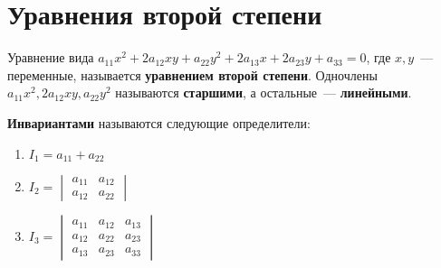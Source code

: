 \section{Уравнения второй степени}
\label{sect:second_degree_equations_on_plane}
Уравнение вида $a_{11} x^2 + 2 a_{12} xy + a_{22} y^2 + 2 a_{13} x + 2 a_{23} y + a_{33} = 0$, где $x, y$~--- переменные, называется \textbf{уравнением второй степени}.
Одночлены $a_{11} x^2, 2 a_{12} xy, a_{22} y^2$ называются \textbf{старшими}, а остальные~--- \textbf{линейными}.

\textbf{Инвариантами} называются следующие определители:
\begin{enumerate}
	\item $I_1 = a_{11} + a_{22}$
	
	\item $I_2 =
	\begin{vmatrix}
	a_{11} & a_{12} \\
	a_{12} & a_{22}
	\end{vmatrix}$
	
	\item $I_3 =
	\begin{vmatrix}
	a_{11} & a_{12} & a_{13} \\
	a_{12} & a_{22} & a_{23} \\
	a_{13} & a_{23} & a_{33}
	\end{vmatrix}$
\end{enumerate}

